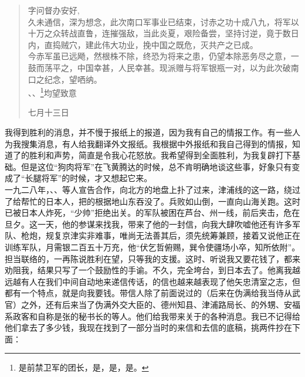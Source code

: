 \begin{quote}
	字问督办安好,\\

久未通信，深为想念，此次南口军事业已结束，讨赤之功十成八九，将军以十万之众转战直鲁，连摧强敌，当此炎夏，艰险备尝，坚持讨逆，竟于数日内，直捣贼穴，建此伟大功业，挽中国之既危，灭共产之已成。\\

今赤军虽已远飏，然根株不除，终恐为将来之患，仍望本除恶务尽之意，一鼓而荡平之，中国幸甚，人民幸甚。现派赠与将军银瓶一对，以为此次破南口之纪念，望哂纳。\\

、、\footnote{是前禁卫军的团长，是，是，是。}均望致意\\

\begin{flushright}
	七月十三日\\
\end{flushright}
\end{quote}

我得到胜利的消息，并不慢于报纸上的报道，因为我有自己的情报工作。有一些人为我搜集消息，有人给我翻译外文报纸。我根据中外报纸和我自己得到的情报，知道了的胜利和声势，简直是令我心花怒放。我希望得到全面胜利，为我复辟打下基础。但是这位“狗肉将军”在飞黄腾达的时候，总不肯明确地谈这些事，好象只有变成了“长腿将军”的时候，才又想起它来。\\

一九二八年，、、等人宣告合作，向北方的地盘上扑了过来，津浦线的这一路，绕过了给帮忙的日本人，把的根据地山东吞没了。兵败如山倒，一直向山海关跑。这时已被日本人炸死，“少帅”拒绝出关。的军队被困在芦台、州一线，前后夹击，危在旦夕。这一天，他的参谋来找我，带来了他的一封信，向我大肆吹嘘他还有许多军队、枪炮，规复京津实非难事，唯尚无法善其后，须先统筹兼顾，接着又说他正在训练军队，月需银二百五十万充，他“伏乞哲俯赐，巽令使疆场小卒，知所依附”。担当联络的，一再陈说胜利在望，只等我的支援。这时、听说我又要花钱了，都来劝阻我，结果只写了一个鼓励性的手谕。不久，完全垮台，到日本去了。他离我越远越有人在我们中间自动地来递信传话，的信也越来越表现了他矢忠清室之志，但都有一个特点，就是向我要钱。带信人除了前面说过的（后来在伪满给我当侍从武官）之外，还有后来当了伪满外交大臣的、德州知县、津浦路局长、的外甥、安福系政客和自称是张的秘书长的等人。他们给我带来关于的各种消息。我已不记得给他们拿去了多少钱，我现在找到了一部分当时的来信和去信的底稿，挑两件抄在下面：\\


